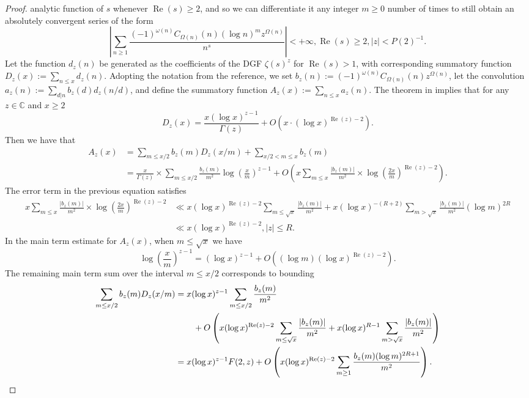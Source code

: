 \documentclass[11pt,reqno,a4letter]{article}
\numberwithin{figure}{section}
\numberwithin{table}{section}
\theoremstyle{plain}
\numberwithin{theorem}{section}
\theoremstyle{definition}
\renewcommand{\Re}{\operatorname{Re}}
\begin{document}
\begin{proof}
analytic function of $s$ whenever $\Re(s) \geq 2$, and so we can differentiate it any integer 
$m \geq 0$ number of times to still obtain an absolutely convergent series of the form 
\[
\left\lvert \sum_{n \geq 1} \frac{(-1)^{\omega(n)} C_{\Omega(n)}(n) (\log n)^m z^{\Omega(n)}}{n^s} 
     \right\rvert < +\infty, \Re(s) \geq 2, |z| < P(2)^{-1}. 
\]
Let the function $d_z(n)$ be generated as the coefficients of the DGF 
$\zeta(s)^{z}$ for $\Re(s) > 1$, with corresponding 
summatory function $D_z(x) := \sum_{n \leq x} d_z(n)$. 
Adopting the notation from the reference, we set 
$b_z(n) := (-1)^{\omega(n)} C_{\Omega(n)}(n) z^{\Omega(n)}$, let the convolution 
$a_z(n) := \sum_{d|n} b_z(d) d_z(n/d)$, and define the summatory function 
$A_z(x) := \sum_{n \leq x} a_z(n)$. 
The theorem in \cite[Thm.\ 7.17; \S 7.4]{MV} implies that for any $z \in \mathbb{C}$ and $x \geq 2$ 
\[
D_z(x) = \frac{x (\log x)^{z-1}}{\Gamma(z)} + O\left(x \cdot (\log x)^{\Re(z)-2}\right). 
\]
Then we have that 
\begin{align*} 
A_z(x) & = \sum_{m \leq x/2} b_z(m) D_z(x/m) + \sum_{x/2 < m \leq x} b_z(m) \\ 
     & = \frac{x}{\Gamma(z)} \times \sum_{m \leq x/2} 
     \frac{b_z(m)}{m^2} \log\left(\frac{x}{m}\right)^{z-1} + 
     O\left(x \sum_{m \leq x} \frac{|b_z(m)|}{m^2} \times 
     \log\left(\frac{2x}{m}\right)^{\Re(z) - 2}\right). 
\end{align*} 
The error term in the previous equation satisfies 
\begin{align*} 
x \sum_{m \leq x} \frac{|b_z(m)|}{m^2} \times 
     \log\left(\frac{2x}{m}\right)^{\Re(z) - 2} & \ll 
     x (\log x)^{\Re(z) - 2} \sum_{m \leq \sqrt{x}} \frac{|b_z(m)|}{m^2} + 
     x (\log x)^{-(R+2)} \sum_{m > \sqrt{x}} \frac{|b_z(m)|}{m^2} (\log m)^{2R} \\ 
     & \ll x (\log x)^{\Re(z) - 2}, |z| \leq R. 
\end{align*} 
In the main term estimate for $A_z(x)$, when $m \leq \sqrt{x}$ we have 
\[
\log\left(\frac{x}{m}\right)^{z-1} = (\log x)^{z-1} + 
     O\left((\log m) (\log x)^{\Re(z) - 2}\right). 
\]
The remaining main term sum over the interval $m \leq x/2$ corresponds to bounding 
\begin{align*} 
\sum_{m \leq x/2} b_z(m) D_z(x/m) & = x (\log x)^{z-1} \sum_{m \leq x/2} \frac{b_z(m)}{m^2} \\ 
     & \phantom{=\quad\ } + 
     O\left(x (\log x)^{\Re(z)-2} \sum_{m \leq \sqrt{x}} \frac{|b_z(m)|}{m^2} + 
     x (\log x)^{R-1} \sum_{m > \sqrt{x}} \frac{|b_z(m)|}{m^2}\right) \\ 
     & = x (\log x)^{z-1} F(2, z) + O\left( 
     x (\log x)^{\Re(z)-2} \sum_{m \geq 1} \frac{b_z(m) (\log m)^{2R+1}}{m^2} 
     \right).
     \qedhere  
\end{align*} 
\end{proof} 
\end{document}
